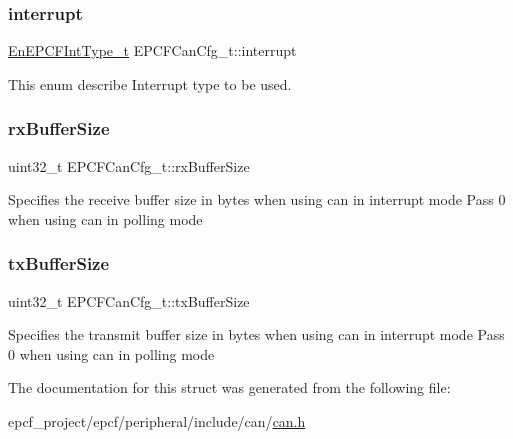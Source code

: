 \subsubsection{\texorpdfstring{interrupt}{interrupt}}
{\footnotesize\ttfamily \mbox{\hyperlink{can_8h_a62829201a68b21def737cc94b7e20803}{En\+E\+P\+C\+F\+Int\+Type\+\_\+t}} E\+P\+C\+F\+Can\+Cfg\+\_\+t\+::interrupt}

This enum describe Interrupt type to be used. \mbox{\label{structEPCFCanCfg__t_aec4941edd2881599b4e1ecf5931cac29}} 
\subsubsection{\texorpdfstring{rx\+Buffer\+Size}{rxBufferSize}}
{\footnotesize\ttfamily uint32\+\_\+t E\+P\+C\+F\+Can\+Cfg\+\_\+t\+::rx\+Buffer\+Size}

Specifies the receive buffer size in bytes when using can in interrupt mode Pass 0 when using can in polling mode \mbox{\label{structEPCFCanCfg__t_a51b05993d7024d2f9509d08107f43823}} 
\subsubsection{\texorpdfstring{tx\+Buffer\+Size}{txBufferSize}}
{\footnotesize\ttfamily uint32\+\_\+t E\+P\+C\+F\+Can\+Cfg\+\_\+t\+::tx\+Buffer\+Size}

Specifies the transmit buffer size in bytes when using can in interrupt mode Pass 0 when using can in polling mode 

The documentation for this struct was generated from the following file\+:\begin{DoxyCompactItemize}
\item 
epcf\+\_\+project/epcf/peripheral/include/can/\mbox{\hyperlink{can_8h}{can.\+h}}\end{DoxyCompactItemize}
